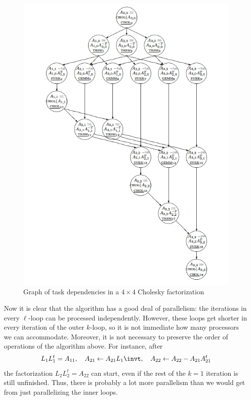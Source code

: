 \begin{figure}[ht]
\includegraphics[scale=.7]{graphics/chol4dag}
  \caption{Graph of task dependencies in a $4\times4$ Cholesky
    factorization}
  \label{fig:chol4dag}
\end{figure}

Now it is clear that the algorithm has a good deal of parallelism: the
iterations in every $\ell$-loop can be processed independently.
However, these loops get shorter in every iteration of the outer
$k$-loop, so it is not immediate how many processors we can
accommodate. Moreover, it is not necessary to preserve the order of
operations of the algorithm above. For instance, after
\[
  L_1L_1^t=A_{11},\quad A_{21}\leftarrow A_{21}L_1\invt,\quad
  A_{22}\leftarrow A_{22}-A_{21}A_{21}^t
\]
the factorization $L_2L_2^t=A_{22}$ can start, even if the rest of the
$k=1$ iteration is still unfinished. Thus, there is probably a lot more
parallelism than we would get from just parallelizing the inner loops.

